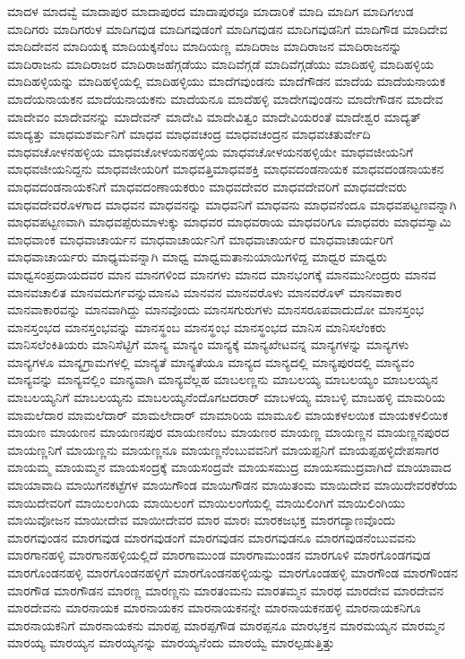 {ಮಾದಳ
ಮಾದವ್ವೆ
ಮಾದಾಪುರ
ಮಾದಾಪುರದ
ಮಾದಾಪುರವೂ
ಮಾದಾರಿಕೆ
ಮಾದಿ
ಮಾದಿಗ
ಮಾದಿಗಉಡ
ಮಾದಿಗರು
ಮಾದಿಗರುಳ
ಮಾದಿಗವುಡ
ಮಾದಿಗವುಡಂಗೆ
ಮಾದಿಗವುಡನ
ಮಾದಿಗವುಡನಿಗೆ
ಮಾದಿಗೌಡ
ಮಾದಿದೇವ
ಮಾದಿದೇವನ
ಮಾದಿಯಕ್ಕ
ಮಾದಿಯಕ್ಕನೆಂಬ
ಮಾದಿಯಣ್ಣ
ಮಾದಿರಾಜ
ಮಾದಿರಾಜನ
ಮಾದಿರಾಜನನ್ನು
ಮಾದಿರಾಜನು
ಮಾದಿರಾಜರ
ಮಾದಿರಾಜಹೆಗ್ಗಡೆಯು
ಮಾದಿವೆಗ್ಗಡೆ
ಮಾದಿವೆಗ್ಗಡೆಯು
ಮಾದಿಹಳ್ಳಿ
ಮಾದಿಹಳ್ಳಿಯ
ಮಾದಿಹಳ್ಳಿಯನ್ನು
ಮಾದಿಹಳ್ಳಿಯಲ್ಲಿ
ಮಾದಿಹಳ್ಳಿಯು
ಮಾದೆಗವುಂಡನು
ಮಾದೆಗೌಡನ
ಮಾದೆಯ
ಮಾದೆಯನಾಯಕ
ಮಾದೆಯನಾಯಕನ
ಮಾದೆಯನಾಯಕನು
ಮಾದೆಯನೂ
ಮಾದೆಹಳ್ಳಿ
ಮಾದೇಗವುಂಡನು
ಮಾದೇಗೌಡನ
ಮಾದೇವ
ಮಾದೇವಂ
ಮಾದೇವನನ್ನು
ಮಾದೇವನ್
ಮಾದೇವಿ
ಮಾದೇವಿತ್ವಂ
ಮಾದೇವಿಯರಂತೆ
ಮಾದೇಶ್ವರ
ಮಾದ್ಯತ್
ಮಾದ್ಯತ್ತು
ಮಾಧಮಶರ್ಮನಿಗೆ
ಮಾಧವ
ಮಾಧವಚಂದ್ರ
ಮಾಧವಚಂದ್ರನ
ಮಾಧವಚತುರ್ವೇದಿ
ಮಾಧವಚೋಳನಹಳ್ಳಿಯ
ಮಾಧವಚೋಳಯನಹಳ್ಳಿಯ
ಮಾಧವಚೋಳಯನಹಳ್ಳಿಯೇ
ಮಾಧವಜೀಯನಿಗೆ
ಮಾಧವಜೀಯನಿದ್ದನು
ಮಾಧವಜೀಯರಿಗೆ
ಮಾಧವತ್ತಿಮಾಧವಶಕ್ತಿ
ಮಾಧವದಂಡನಾಯಕ
ಮಾಧವದಂಡನಾಯಕನ
ಮಾಧವದಂಡನಾಯಕನಿಗೆ
ಮಾಧವದಂಣಾಯಕರುಂ
ಮಾಧವದೇವರ
ಮಾಧವದೇವರಿಗೆ
ಮಾಧವದೇವರು
ಮಾಧವದೇವರೊಳಗಾದ
ಮಾಧವನ
ಮಾಧವನನ್ನು
ಮಾಧವನಿಗೆ
ಮಾಧವನು
ಮಾಧವನೆಂದೂ
ಮಾಧವಪಟ್ಟಣವನ್ನಾಗಿ
ಮಾಧವಪಟ್ಟಣವಾಗಿ
ಮಾಧವಪ್ಪೆರುಮಾಳುಕ್ಕು
ಮಾಧವರ
ಮಾಧವರಾಯ
ಮಾಧವರಿಗೂ
ಮಾಧವರು
ಮಾಧವಸ್ವಾಮಿ
ಮಾಧವಾಂಕ
ಮಾಧವಾಚಾರ್ಯನ
ಮಾಧವಾಚಾರ್ಯನಿಗೆ
ಮಾಧವಾಚಾರ್ಯರ
ಮಾಧವಾಚಾರ್ಯರಿಗೆ
ಮಾಧವಾಚಾರ್ಯರು
ಮಾಧ್ಯಮವನ್ನಾಗಿ
ಮಾಧ್ವ
ಮಾಧ್ವಮತಾನುಯಾಯಿಗಳಿದ್ದ
ಮಾಧ್ವರ
ಮಾಧ್ವರು
ಮಾಧ್ವಸಂಪ್ರದಾಯದವರ
ಮಾನ
ಮಾನಗಳಿಂದ
ಮಾನಗಳು
ಮಾನದ
ಮಾನಭಂಗಕ್ಕೆ
ಮಾನಮುನೀಂದ್ರರು
ಮಾನವ
ಮಾನವಚಾಲಿತ
ಮಾನವದುರ್ಗವನ್ನುಮಾನವಿ
ಮಾನವನ
ಮಾನವರೊಳು
ಮಾನವರೊಳ್
ಮಾನವಾಕಾರ
ಮಾನವಾಕಾರವನ್ನು
ಮಾನವಾಗಿದ್ದು
ಮಾನವೊಂದು
ಮಾನಸಗುರುಗಳು
ಮಾನಸರೂಪವಾದುದೋ
ಮಾನಸ್ತಂಭ
ಮಾನಸ್ತಂಭದ
ಮಾನಸ್ತಂಭವನ್ನು
ಮಾನಸ್ಥಂಬ
ಮಾನಸ್ಥಂಭ
ಮಾನಸ್ಥಂಭದ
ಮಾನಿಸ
ಮಾನಿಸಲೆಂಕರು
ಮಾನಿಸಲೆಂಕಿತಿಯರು
ಮಾನಿಸೆಟ್ಟಿಗೆ
ಮಾನ್ಯ
ಮಾನ್ಯಂ
ಮಾನ್ಯಕ್ಕೆ
ಮಾನ್ಯಖೇಟವನ್ನ
ಮಾನ್ಯಗಳನ್ನು
ಮಾನ್ಯಗಳು
ಮಾನ್ಯಗಳೂ
ಮಾನ್ಯಗ್ರಾಮಗಳಲ್ಲಿ
ಮಾನ್ಯತೆ
ಮಾನ್ಯತೆಯೂ
ಮಾನ್ಯದ
ಮಾನ್ಯದಲ್ಲಿ
ಮಾನ್ಯಪುರದಲ್ಲಿ
ಮಾನ್ಯವಂ
ಮಾನ್ಯವನ್ನು
ಮಾನ್ಯವಲ್ಲಿಂ
ಮಾನ್ಯವಾಗಿ
ಮಾನ್ಯವೆಲ್ಲಹ
ಮಾಬಲಣ್ಣನು
ಮಾಬಲಯ್ಯ
ಮಾಬಲಯ್ಯಂ
ಮಾಬಲಯ್ಯನ
ಮಾಬಲಯ್ಯನಿಗೆ
ಮಾಬಲಯ್ಯನು
ಮಾಬಲಯ್ಯನೆಂದೊಗೞದರಾರ್
ಮಾಬಳಯ್ಯ
ಮಾಬಳ್ಳಿ
ಮಾಬಹಳ್ಳಿ
ಮಾಮರಿಯ
ಮಾಮಲೆದಾರ
ಮಾಮಲೆದಾರ್
ಮಾಮಲೇದಾರ್
ಮಾಮಾರಿಯ
ಮಾಮೂಲಿ
ಮಾಯಕಳಲಯಿಕ
ಮಾಯಕಳಲಿಯಿಕ
ಮಾಯಣ
ಮಾಯಣನ
ಮಾಯಣನಪುರ
ಮಾಯಣನೆಂಬ
ಮಾಯಣರ
ಮಾಯಣ್ಣ
ಮಾಯಣ್ಣನ
ಮಾಯಣ್ಣನಪುರದ
ಮಾಯಣ್ಣನಿಗೆ
ಮಾಯಣ್ಣನು
ಮಾಯಣ್ಣನೂ
ಮಾಯಣ್ಣನೆಂಬುವವನಿಗೆ
ಮಾಯಪ್ಪನಿಗೆ
ಮಾಯಪ್ಪಹಳ್ಳಿದೇಪಸಾಗರ
ಮಾಯಮ್ಮ
ಮಾಯಮ್ಮನ
ಮಾಯಸಂದ್ರಕ್ಕೆ
ಮಾಯಸಂದ್ರವೇ
ಮಾಯಸಮುದ್ರ
ಮಾಯಸಮುದ್ರವಾಗಿದೆ
ಮಾಯಾವಾದ
ಮಾಯಾವಾದಿ
ಮಾಯಿಗನಕಟ್ಟೆಗಳ
ಮಾಯಿಗೌಂಡ
ಮಾಯಿಗೌಡನ
ಮಾಯಿತಂಮ
ಮಾಯಿದೇವ
ಮಾಯಿದೇವರಕೆರೆಯ
ಮಾಯಿದೇವರಿಗೆ
ಮಾಯಿಲಂಗಿಯ
ಮಾಯಿಲಂಗೆ
ಮಾಯಿಲಂಗೆಯಲ್ಲಿ
ಮಾಯಿಲಿಂಗಿಗೆ
ಮಾಯಿಲಿಂಗಿಯು
ಮಾಯಿವೋಜನ
ಮಾಯೀದೇವ
ಮಾಯೀದೇವರ
ಮಾರ
ಮಾರಃ
ಮಾರಕಜಭಕ್ತ
ಮಾರಗದ್ಯಾಣವೊಂದು
ಮಾರಗವುಂಡನ
ಮಾರಗವುಡ
ಮಾರಗವುಡಂಗೆ
ಮಾರಗವುಡನ
ಮಾರಗವುಡನೂ
ಮಾರಗವುಡನೆಂಬುವವನು
ಮಾರಗಾನಹಳ್ಳಿ
ಮಾರಗಾನಹಳ್ಳಿಯಲ್ಲಿದೆ
ಮಾರಗಾಮುಂಡ
ಮಾರಗಾಮುಂಡನ
ಮಾರಗೂಳಿ
ಮಾರಗೊಂಡಗವುಡ
ಮಾರಗೊಂಡನಹಳ್ಳಿ
ಮಾರಗೊಂಡನಹಳ್ಳಿಗೆ
ಮಾರಗೊಂಡನಹಳ್ಳಿಯನ್ನು
ಮಾರಗೊಂಡಹಳ್ಳಿ
ಮಾರಗೌಂಡ
ಮಾರಗೌಂಡನ
ಮಾರಗೌಡ
ಮಾರಗೌಡನ
ಮಾರಣ್ಣ
ಮಾರಣ್ಣನು
ಮಾರತಂಮನು
ಮಾರತಮ್ಮನ
ಮಾರಥ
ಮಾರದೇವ
ಮಾರದೇವನ
ಮಾರದೇವನು
ಮಾರನಾಯಕ
ಮಾರನಾಯಕನ
ಮಾರನಾಯಕನನ್ನೇ
ಮಾರನಾಯಕನಹಳ್ಳಿ
ಮಾರನಾಯಕನಿಗೂ
ಮಾರನಾಯಕನಿಗೆ
ಮಾರನಾಯಕನು
ಮಾರಪ್ಪ
ಮಾರಪ್ಪಗೌಡ
ಮಾರಪ್ಪನೂ
ಮಾರಭಕ್ತನ
ಮಾರಮಯ್ಯನ
ಮಾರಮ್ಮನ
ಮಾರಯ್ಯ
ಮಾರಯ್ಯನ
ಮಾರಯ್ಯನನ್ನು
ಮಾರಯ್ಯನೆಂದು
ಮಾರಯ್ವೆ
ಮಾರಲ್ಪಡುತ್ತಿತ್ತು
}
